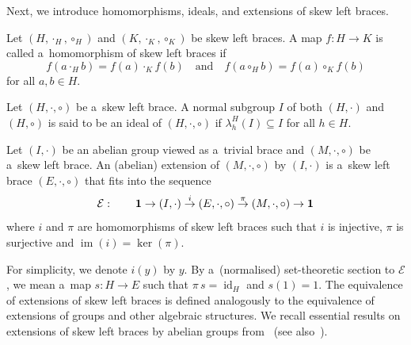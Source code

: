 \documentclass{jonasart}
\theoremstyle{plain}
\DeclareMathOperator{\Id}{id}
\DeclareMathOperator{\im}{im}
\begin{document}
	Next, we introduce homomorphisms, ideals, and extensions of skew left braces.
	
	\begin{definition}
		Let $(H, \cdot_H, \circ_H )$ and $(K, \cdot_K, \circ_K )$ be skew left braces. A map $f: H \rightarrow K$ is called a~homomorphism of skew left braces if
		\[
		f(a \cdot_H b)=f(a) \cdot_K f(b) \quad \textrm{and} \quad f(a \circ_H b)=f(a) \circ_K f(b)
		\]
		for all $a, b \in H$.
	\end{definition}
	
	\begin{definition}
		Let $(H,\cdot,\circ)$ be a~skew left brace. A normal subgroup $I$ of both $(H,\cdot)$ and $(H,\circ)$ is said to be an ideal of $(H,\cdot,\circ)$ if $\lambda^H_h (I)\subseteq I$ for all $h\in H$.
	\end{definition}
	
	\begin{definition}
		Let $(I, \cdot)$ be an abelian group viewed as a~trivial brace and $(M, \cdot,\circ)$ be a~skew left brace. An (abelian) extension of $(M, \cdot,\circ)$ by $(I,\cdot)$ is a~skew left brace $(E,\cdot,\circ)$ that fits into the sequence
		\[
		\mathcal{E} : \quad \quad {\bf 1} \to (I,\cdot) \stackrel{i}{\to}  (E,\cdot,\circ) \stackrel{\pi}{\to} (M,\cdot,\circ) \to {\bf 1}
		\]
		where $i$ and $\pi$ are homomorphisms of skew left braces such that
		$i$ is injective, $\pi$ is surjective and $\im(i)=\ker(\pi)$.
	\end{definition}
	
	For simplicity, we denote $i(y)$ by $y$. By a~(normalised) set-theoretic section to $\mathcal{E}$, we mean a~map $s: H \rightarrow E$ such that $\pi \, s= \Id_{H}$ and $s(1)=1$. The equivalence of extensions of skew left braces is defined analogously to the equivalence of extensions of groups and other algebraic structures. 	We recall essential results on extensions of skew left braces by abelian groups from~\cite{MR4604853} (see also~\cite{MR3530867}).
	
\end{document}
